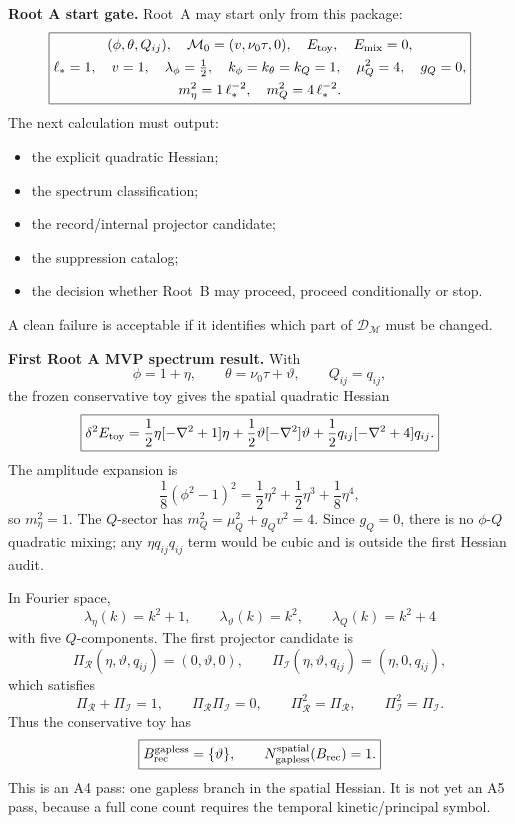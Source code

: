 \documentclass[11pt]{article}
\begin{document}
\medskip\noindent\textbf{Root A start gate.}
Root~A may start only from this package:
\[
\boxed{
\begin{gathered}
(\phi,\theta,Q_{ij}),\quad
\mathcal M_0=(v,\nu_0\tau,0),\quad
E_{\rm toy},\quad E_{\rm mix}=0,\\
\ell_*=1,\quad
v=1,\quad
\lambda_\phi=\tfrac12,\quad
k_\phi=k_\theta=k_Q=1,\quad
\mu_Q^2=4,\quad g_Q=0,\\
m_\eta^2=1\,\ell_*^{-2},\quad
m_Q^2=4\,\ell_*^{-2}.
\end{gathered}
}
\]
The next calculation must output:
\begin{itemize}
\item the explicit quadratic Hessian;
\item the spectrum classification;
\item the record/internal projector candidate;
\item the suppression catalog;
\item the decision whether Root~B may proceed, proceed conditionally or stop.
\end{itemize}
A clean failure is acceptable if it identifies which part of
\(\mathcal D_{\mathcal M}\) must be changed.

\medskip\noindent\textbf{First Root A MVP spectrum result.}
With
\[
\phi=1+\eta,\qquad \theta=\nu_0\tau+\vartheta,\qquad Q_{ij}=q_{ij},
\]
the frozen conservative toy gives the spatial quadratic Hessian
\[
\boxed{
\delta^2E_{\rm toy}
=\frac12\eta[-\nabla^2+1]\eta
+\frac12\vartheta[-\nabla^2]\vartheta
+\frac12q_{ij}[-\nabla^2+4]q_{ij}.
}
\]
The amplitude expansion is
\[
\frac18(\phi^2-1)^2
=\frac12\eta^2+\frac12\eta^3+\frac18\eta^4,
\]
so \(m_\eta^2=1\).  The \(Q\)-sector has
\(m_Q^2=\mu_Q^2+g_Qv^2=4\).  Since \(g_Q=0\), there is no \(\phi\)-\(Q\)
quadratic mixing; any \(\eta q_{ij}q_{ij}\) term would be cubic and is outside
the first Hessian audit.

In Fourier space,
\[
\boxed{
\lambda_\eta(k)=k^2+1,\qquad
\lambda_\vartheta(k)=k^2,\qquad
\lambda_Q(k)=k^2+4
}
\]
with five \(Q\)-components.  The first projector candidate is
\[
\boxed{
\Pi_{\mathcal R}(\eta,\vartheta,q_{ij})=(0,\vartheta,0),\qquad
\Pi_{\mathcal I}(\eta,\vartheta,q_{ij})=(\eta,0,q_{ij}),
}
\]
which satisfies
\[
\Pi_{\mathcal R}+\Pi_{\mathcal I}=1,\qquad
\Pi_{\mathcal R}\Pi_{\mathcal I}=0,\qquad
\Pi_{\mathcal R}^2=\Pi_{\mathcal R},\qquad
\Pi_{\mathcal I}^2=\Pi_{\mathcal I}.
\]
Thus the conservative toy has
\[
\boxed{
B_{\rm rec}^{\rm gapless}=\{\vartheta\},\qquad
N_{\rm gapless}^{\rm spatial}(B_{\rm rec})=1.
}
\]
This is an A4 pass: one gapless branch in the spatial Hessian.  It is not yet
an A5 pass, because a full cone count requires the temporal kinetic/principal
symbol.
\end{document}
